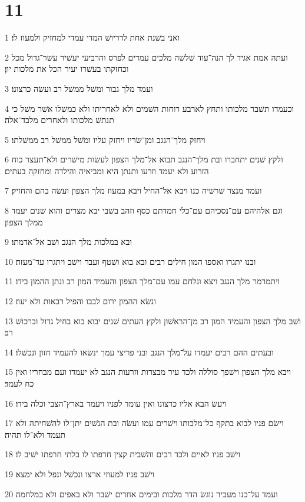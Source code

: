 \chapter{11}

\par 1 ואני בשׁנת אחת לדריושׁ המדי עמדי למחזיק ולמעוז לו׃
\par 2 ועתה אמת אגיד לך הנה־עוד שׁלשׁה מלכים עמדים לפרס והרביעי יעשׁיר עשׁר־גדול מכל וכחזקתו בעשׁרו יעיר הכל את מלכות יון׃
\par 3 ועמד מלך גבור ומשׁל ממשׁל רב ועשׂה כרצונו׃
\par 4 וכעמדו תשׁבר מלכותו ותחץ לארבע רוחות השׁמים ולא לאחריתו ולא כמשׁלו אשׁר משׁל כי תנתשׁ מלכותו ולאחרים מלבד־אלה׃
\par 5 ויחזק מלך־הנגב ומן־שׂריו ויחזק עליו ומשׁל ממשׁל רב ממשׁלתו׃
\par 6 ולקץ שׁנים יתחברו ובת מלך־הנגב תבוא אל־מלך הצפון לעשׂות מישׁרים ולא־תעצר כוח הזרוע ולא יעמד וזרעו ותנתן היא ומביאיה והילדה ומחזקה בעתים׃
\par 7 ועמד מנצר שׁרשׁיה כנו ויבא אל־החיל ויבא במעוז מלך הצפון ועשׂה בהם והחזיק׃
\par 8 וגם אלהיהם עם־נסכיהם עם־כלי חמדתם כסף וזהב בשׁבי יבא מצרים והוא שׁנים יעמד ממלך הצפון׃
\par 9 ובא במלכות מלך הנגב ושׁב אל־אדמתו׃
\par 10 ובנו יתגרו ואספו המון חילים רבים ובא בוא ושׁטף ועבר וישׁב ויתגרו עד־מעזה׃
\par 11 ויתמרמר מלך הנגב ויצא ונלחם עמו עם־מלך הצפון והעמיד המון רב ונתן ההמון בידו׃
\par 12 ונשׂא ההמון ירום לבבו והפיל רבאות ולא יעוז׃
\par 13 ושׁב מלך הצפון והעמיד המון רב מן־הראשׁון ולקץ העתים שׁנים יבוא בוא בחיל גדול וברכושׁ רב׃
\par 14 ובעתים ההם רבים יעמדו על־מלך הנגב ובני פריצי עמך ינשׂאו להעמיד חזון ונכשׁלו׃
\par 15 ויבא מלך הצפון וישׁפך סוללה ולכד עיר מבצרות וזרעות הנגב לא יעמדו ועם מבחריו ואין כח לעמד׃
\par 16 ויעשׂ הבא אליו כרצונו ואין עומד לפניו ויעמד בארץ־הצבי וכלה בידו׃
\par 17 וישׂם פניו לבוא בתקף כל־מלכותו וישׁרים עמו ועשׂה ובת הנשׁים יתן־לו להשׁחיתה ולא תעמד ולא־לו תהיה׃
\par 18 וישׁב פניו לאיים ולכד רבים והשׁבית קצין חרפתו לו בלתי חרפתו ישׁיב לו׃
\par 19 וישׁב פניו למעוזי ארצו ונכשׁל ונפל ולא ימצא׃
\par 20 ועמד על־כנו מעביר נוגשׂ הדר מלכות ובימים אחדים ישׁבר ולא באפים ולא במלחמה׃
